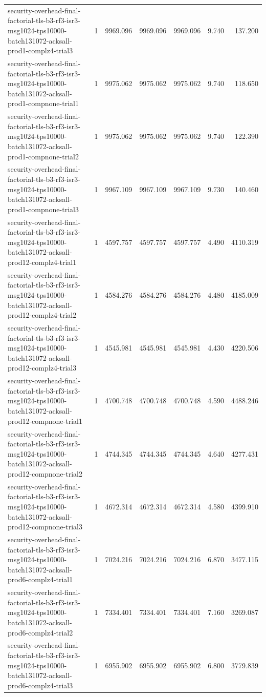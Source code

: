 \begin{tabular}{lrrrrrr}
security-overhead-final-factorial-tls-b3-rf3-isr3-msg1024-tps10000-batch131072-acksall-prod1-complz4-trial3 & 1 & 9969.096 & 9969.096 & 9969.096 & 9.740 & 137.200 \\
security-overhead-final-factorial-tls-b3-rf3-isr3-msg1024-tps10000-batch131072-acksall-prod1-compnone-trial1 & 1 & 9975.062 & 9975.062 & 9975.062 & 9.740 & 118.650 \\
security-overhead-final-factorial-tls-b3-rf3-isr3-msg1024-tps10000-batch131072-acksall-prod1-compnone-trial2 & 1 & 9975.062 & 9975.062 & 9975.062 & 9.740 & 122.390 \\
security-overhead-final-factorial-tls-b3-rf3-isr3-msg1024-tps10000-batch131072-acksall-prod1-compnone-trial3 & 1 & 9967.109 & 9967.109 & 9967.109 & 9.730 & 140.460 \\
security-overhead-final-factorial-tls-b3-rf3-isr3-msg1024-tps10000-batch131072-acksall-prod12-complz4-trial1 & 1 & 4597.757 & 4597.757 & 4597.757 & 4.490 & 4110.319 \\
security-overhead-final-factorial-tls-b3-rf3-isr3-msg1024-tps10000-batch131072-acksall-prod12-complz4-trial2 & 1 & 4584.276 & 4584.276 & 4584.276 & 4.480 & 4185.009 \\
security-overhead-final-factorial-tls-b3-rf3-isr3-msg1024-tps10000-batch131072-acksall-prod12-complz4-trial3 & 1 & 4545.981 & 4545.981 & 4545.981 & 4.430 & 4220.506 \\
security-overhead-final-factorial-tls-b3-rf3-isr3-msg1024-tps10000-batch131072-acksall-prod12-compnone-trial1 & 1 & 4700.748 & 4700.748 & 4700.748 & 4.590 & 4488.246 \\
security-overhead-final-factorial-tls-b3-rf3-isr3-msg1024-tps10000-batch131072-acksall-prod12-compnone-trial2 & 1 & 4744.345 & 4744.345 & 4744.345 & 4.640 & 4277.431 \\
security-overhead-final-factorial-tls-b3-rf3-isr3-msg1024-tps10000-batch131072-acksall-prod12-compnone-trial3 & 1 & 4672.314 & 4672.314 & 4672.314 & 4.580 & 4399.910 \\
security-overhead-final-factorial-tls-b3-rf3-isr3-msg1024-tps10000-batch131072-acksall-prod6-complz4-trial1 & 1 & 7024.216 & 7024.216 & 7024.216 & 6.870 & 3477.115 \\
security-overhead-final-factorial-tls-b3-rf3-isr3-msg1024-tps10000-batch131072-acksall-prod6-complz4-trial2 & 1 & 7334.401 & 7334.401 & 7334.401 & 7.160 & 3269.087 \\
security-overhead-final-factorial-tls-b3-rf3-isr3-msg1024-tps10000-batch131072-acksall-prod6-complz4-trial3 & 1 & 6955.902 & 6955.902 & 6955.902 & 6.800 & 3779.839 \\

\end{tabular}
